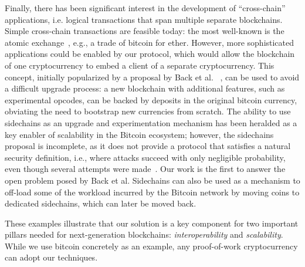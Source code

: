 Finally, there has been significant interest in the development of
``cross-chain'' applications, i.e. logical transactions that span multiple
separate blockchains. Simple cross-chain transactions are feasible today: the
most well-known is the atomic exchange~\cite{tiernolan}, e.g., a trade of
bitcoin for ether. However, more sophisticated applications could be enabled by
our protocol, which would allow the blockchain of one cryptocurrency to embed a
client of a separate cryptocurrency. This concept, initially popularized by a
proposal by Back et al. ~\cite{sidechains}, can be used to avoid a difficult
upgrade process: a new blockchain with additional features, such as experimental
opcodes, can be backed by deposits in the original bitcoin currency, obviating
the need to bootstrap new currencies from scratch. The ability to use sidechains
as an upgrade and experimentation mechanism has been heralded as a key enabler
of scalability in the Bitcoin ecosystem; however, the sidechains proposal is
incomplete, as it does not provide a protocol that satisfies a natural security
definition, i.e., where attacks succeed with only negligible probability, even
though several attempts were made~\cite{pos,compactspv}. Our work is the
first to answer the open problem posed by Back et al. Sidechains can also be
used as a mechanism to off-load some of the workload incurred by the Bitcoin
network by moving coins to dedicated sidechains, which can later be moved back.

These examples illustrate that our solution is a key component for two important
pillars needed for next-generation blockchains: \textit{interoperability} and
\textit{scalability}. While we use bitcoin concretely as an example, any
proof-of-work cryptocurrency can adopt our techniques.

